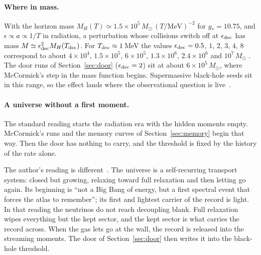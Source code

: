 \paragraph{Where in mass.} With the horizon mass $M_H(T)\simeq1.5\times10^5\,M_\odot\,(T/\mathrm{MeV})^{-2}$ for $g_*=10.75$, and $\epsilon\propto a\propto1/T$ in radiation, a perturbation whose collisions switch off at $\epsilon_{\rm dec}$ has mass $M\simeq\epsilon_{\rm dec}^2M_H(T_{\rm dec})$. For $T_{\rm dec}\approx1$\,MeV the values $\epsilon_{\rm dec}=0.5$, $1$, $2$, $3$, $4$, $8$ correspond to about $4\times10^4$, $1.5\times10^5$, $6\times10^5$, $1.3\times10^6$, $2.4\times10^6$ and $10^7\,M_\odot$ . The door runs of Section~\ref{sec:door} ($\epsilon_{\rm dec}=2$) sit at about $6\times10^5\,M_\odot$, where McCormick's step in the mass function begins. Supermassive black-hole seeds sit in this range, so the effect lands where the observational question is live~\cite{Dave}.

\paragraph{A universe without a first moment.} The standard reading starts the radiation era with the hidden moments empty. McCormick's runs and the memory curves of Section~\ref{sec:memory} begin that way. Then the door has nothing to carry, and the threshold is fixed by the history of the rate alone.

The author's reading is different~\cite{Atlas}. The universe is a self-recurring transport system: closed but growing, relaxing toward full relaxation and then letting go again. Its beginning is ``not a Big Bang of energy, but a first spectral event that forces the atlas to remember''; its first and lightest carrier of the record is light. In that reading the neutrinos do not reach decoupling blank. Full relaxation wipes everything but the kept sector, and the kept sector is what carries the record across. When the gas lets go at the wall, the record is released into the streaming moments. The door of Section~\ref{sec:door} then writes it into the black-hole threshold.

